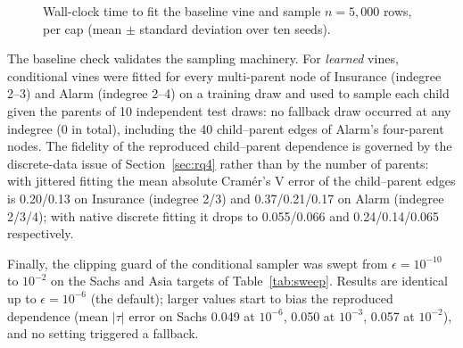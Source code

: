 \documentclass[
  english,
  class=report,
  accentcolor=2c,
  marginpar=false,
  parskip=half-,
  fontsize=11pt,
  ruledheaders=false,
  pdfa=false,
  IMRAD=false,
  thesis={type=master}
]{tudapub}
\begin{document}
\begin{figure}[ht]
\centering
{}
\caption{Wall-clock time to fit the baseline vine and sample $n=5{,}000$ rows, per cap (mean $\pm$ standard deviation over ten seeds).}
\label{fig:indegree-time}
\end{figure}

The baseline check validates the sampling machinery. For \emph{learned}
vines, conditional vines were fitted for every multi-parent node of
Insurance (indegree 2--3) and Alarm (indegree 2--4) on a training draw and
used to sample each child given the parents of 10 independent test draws:
no fallback draw occurred at any indegree (0 in total), including the
40 child--parent edges of Alarm's four-parent nodes. The fidelity of the
reproduced child--parent dependence is governed by the discrete-data issue
of Section~\ref{sec:rq4} rather than by the number of parents: with
jittered fitting the mean absolute Cram\'er's V error of the child--parent
edges is 0.20/0.13 on Insurance (indegree 2/3) and
0.37/0.21/0.17 on Alarm (indegree 2/3/4); with native discrete fitting
it drops to 0.055/0.066 and
0.24/0.14/0.065 respectively.

Finally, the clipping guard of the conditional sampler was swept from
$\epsilon = 10^{-10}$ to $10^{-2}$ on the Sachs and Asia targets of
Table~\ref{tab:sweep}. Results are identical up to $\epsilon = 10^{-6}$
(the default); larger values start to bias the reproduced dependence (mean
$|\tau|$ error on Sachs 0.049 at $10^{-6}$, 0.050 at $10^{-3}$, 0.057 at
$10^{-2}$), and no setting triggered a fallback.
\end{document}
